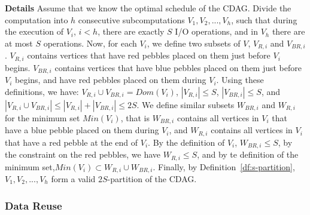 \documentclass[sigplan,review,anonymous]{acmart}\settopmatter{printfolios=true,printccs=false,printacmref=false}
\newcommand{\macb}[1]{\textbf{\textsf{#1}}}
\begin{document}
\macb{Details}
%
%
Assume that we know the optimal schedule of the CDAG. Divide the computation
into $h$ consecutive subcomputations $V_1, V_2, ..., V_h$, such that during the
execution of $V_i$, $i < h$, there are exactly $S$ I/O operations, and in $V_h$
there are at most $S$ operations. Now, for each $V_i$, we define two subsets of
$V$, $V_{R,i}$ and $V_{BR,i}$.
%
%
$V_{R,i}$ contains vertices that have red pebbles placed on them just before
$V_i$ begins.
%
$V_{BR,i}$ contains vertices that have blue pebbles placed on them just before
$V_i$ begins, and have red pebbles placed on them during $V_i$.
%
%
%
%
Using these definitions, we have:  $V_{R,i} \cup V_{BR,i} =
Dom(V_i)$,  $|V_{R,i}| \le S$,  $|V_{BR,i}| \le S$, and
 $|V_{R,i} \cup V_{BR,i}| \le |V_{R,i}| + |V_{BR,i}| \le 2S$.
% 
% 
We define similar subsets $W_{BR,i}$ and $W_{R,i}$ for the minimum set 
$Min(V_i)$, that is $W_{BR,i}$ contains all vertices in $V_i$ that have a blue 
pebble placed on them during $V_i$, and  $W_{R,i}$ contains all vertices in 
$V_i$ that have a red pebble at the end of $V_i$. By the definition of $V_i$, 
$W_{BR,i} \le S$, by the constraint on the red pebbles, we have $W_{R,i} \le 
S$, and by te definition of the minimum set,$Min(V_i) \subset W_{R,i} \cup 
W_{BR,i}$.
%
Finally, by Definition~\ref{df:s-partition}, $V_1, V_2, ..., V_h$ form a valid
$2S$-partition of the CDAG. 


\subsubsection{Data Reuse}
\label{sec:datareuse}
\end{document}
